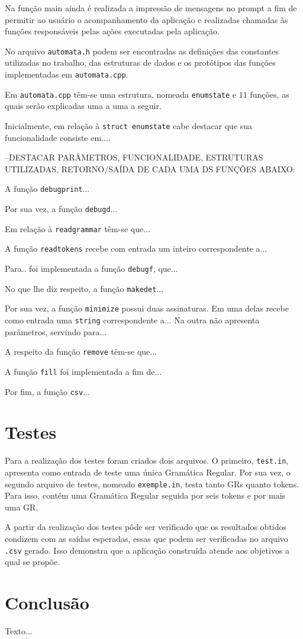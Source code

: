 \documentclass[12pt]{article}
\begin{document}
Na função main ainda é realizada a impressão de mensagens no prompt a fim de permitir ao usuário o acompanhamento da aplicação e realizadas chamadas às funções responsáveis pelas ações executadas pela aplicação.

No arquivo \texttt{automata.h} podem ser encontradas as definições das constantes utilizadas no trabalho, das estruturas de dados e os protótipos das funções implementadas em \texttt{automata.cpp}.

Em \texttt{automata.cpp} têm-se uma estrutura, nomeada \texttt{enumstate} e $11$ funções, as quais serão explicadas uma a uma a seguir.

Inicialmente, em relação à \texttt{struct enumstate} cabe destacar que sua funcionalidade consiste em....


--DESTACAR PARÂMETROS, FUNCIONALIDADE, ESTRUTURAS UTILIZADAS, RETORNO/SAÍDA DE CADA UMA DS FUNÇÕES ABAIXO:

A função \texttt{debugprint}...

Por sua vez, a função \texttt{debugd}...

Em relação à \texttt{readgrammar} têm-se que...

A função \texttt{readtokens} recebe com entrada um inteiro correspondente a...

Para.. foi implementada a função \texttt{debugf}, que...

No que lhe diz respeito, a função \texttt{makedet}...

Por sua vez, a função \texttt{minimize} possui duas assinaturas. Em uma delas recebe como entrada uma \texttt{string} correspondente a... Na outra não apresenta parâmetros, servindo para...

A respeito da função \texttt{remove} têm-se que...

A função \texttt{fill} foi implementada a fim de...

Por fim, a função \texttt{csv}...


\section{Testes}
\label{5}

Para a realização dos testes foram criados dois arquivos. O primeiro, \texttt{test.in}, apresenta como entrada de teste uma única Gramática Regular. Por sua vez, o segundo arquivo de testes, nomeado \texttt{exemple.in}, testa tanto GRs quanto tokens. Para isso, contém uma Gramática Regular seguida por seis tokens e por mais uma GR.

A partir da realização dos testes pôde ser verificado que os resultados obtidos condizem com as saídas esperadas, essas que podem ser verificadas no arquivo \texttt{.csv} gerado. Isso demonstra que a aplicação construída atende aos objetivos a qual se propõe.

\section{Conclusão}
\label{6}

Texto...



\end{document}
